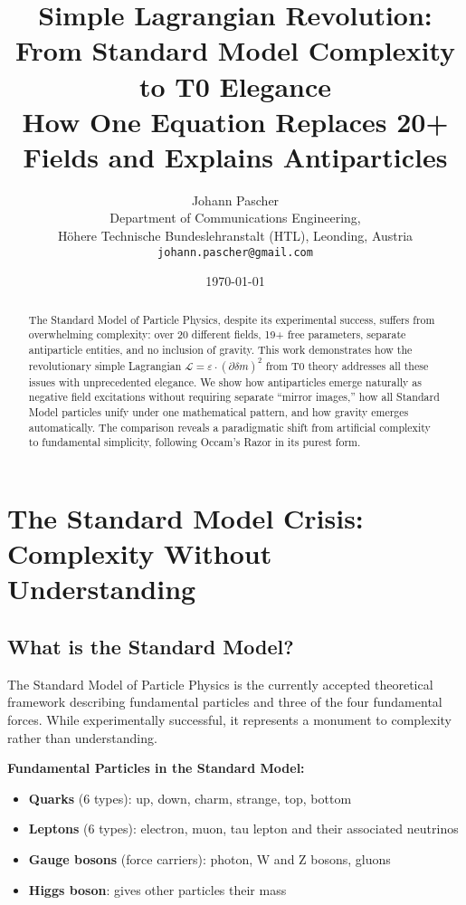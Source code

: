 \documentclass[12pt,a4paper]{article}
\title{Simple Lagrangian Revolution: \\
	From Standard Model Complexity to T0 Elegance \\
	\large How One Equation Replaces 20+ Fields and Explains Antiparticles}
\author{Johann Pascher\\
	Department of Communications Engineering, \\H\"ohere Technische Bundeslehranstalt (HTL), Leonding, Austria\\
	\texttt{johann.pascher@gmail.com}}
\date{\today}
\newcommand{\Lag}{\mathcal{L}}
\newcommand{\deltam}{\delta m}
\theoremstyle{definition}
\theoremstyle{remark}
\begin{document}
	
	\maketitle
	
	\begin{abstract}
		The Standard Model of Particle Physics, despite its experimental success, suffers from overwhelming complexity: over 20 different fields, 19+ free parameters, separate antiparticle entities, and no inclusion of gravity. This work demonstrates how the revolutionary simple Lagrangian $\Lag = \varepsilon \cdot (\partial \deltam)^2$ from T0 theory addresses all these issues with unprecedented elegance. We show how antiparticles emerge naturally as negative field excitations without requiring separate ``mirror images,'' how all Standard Model particles unify under one mathematical pattern, and how gravity emerges automatically. The comparison reveals a paradigmatic shift from artificial complexity to fundamental simplicity, following Occam's Razor in its purest form.
	\end{abstract}
	
	\tableofcontents
	\newpage
	
	\section{The Standard Model Crisis: Complexity Without Understanding}
	
	\subsection{What is the Standard Model?}
	
	The Standard Model of Particle Physics is the currently accepted theoretical framework describing fundamental particles and three of the four fundamental forces. While experimentally successful, it represents a monument to complexity rather than understanding.
	
	\textbf{Fundamental Particles in the Standard Model:}
	\begin{itemize}
		\item \textbf{Quarks} (6 types): up, down, charm, strange, top, bottom
		\item \textbf{Leptons} (6 types): electron, muon, tau lepton and their associated neutrinos
		\item \textbf{Gauge bosons} (force carriers): photon, W and Z bosons, gluons  
		\item \textbf{Higgs boson}: gives other particles their mass
	\end{itemize}
	
\end{document}
